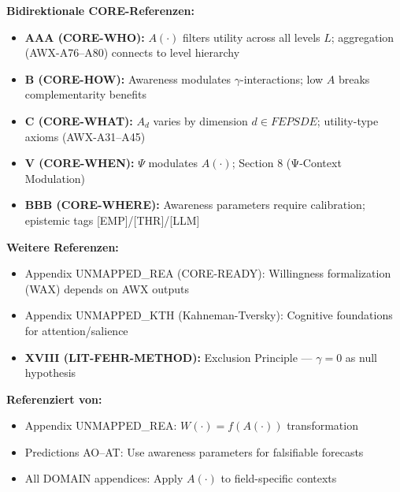\begin{tcolorbox}[colback=purple!5!white, colframe=purple!50!black, title=Cross-Reference Map: 10C CORE Integration]
\textbf{Bidirektionale CORE-Referenzen:}
\begin{itemize}[nosep]
    \item \textbf{AAA (CORE-WHO):} $A(\cdot)$ filters utility across all levels $L$; aggregation (AWX-A76--A80) connects to level hierarchy
    \item \textbf{B (CORE-HOW):} Awareness modulates $\gamma$-interactions; low $A$ breaks complementarity benefits
    \item \textbf{C (CORE-WHAT):} $A_d$ varies by dimension $d \in FEPSDE$; utility-type axioms (AWX-A31--A45)
    \item \textbf{V (CORE-WHEN):} $\Psi$ modulates $A(\cdot)$; Section 8 (Ψ-Context Modulation)
    \item \textbf{BBB (CORE-WHERE):} Awareness parameters require calibration; epistemic tags [EMP]/[THR]/[LLM]
\end{itemize}
\textbf{Weitere Referenzen:}
\begin{itemize}[nosep]
    \item Appendix UNMAPPED_REA (CORE-READY): Willingness formalization (WAX) depends on AWX outputs
    \item Appendix UNMAPPED_KTH (Kahneman-Tversky): Cognitive foundations for attention/salience
    \item \textbf{XVIII (LIT-FEHR-METHOD):} Exclusion Principle --- $\gamma = 0$ as null hypothesis
\end{itemize}
\textbf{Referenziert von:}
\begin{itemize}[nosep]
    \item Appendix UNMAPPED_REA: $W(\cdot) = f(A(\cdot))$ transformation
    \item Predictions AO--AT: Use awareness parameters for falsifiable forecasts
    \item All DOMAIN appendices: Apply $A(\cdot)$ to field-specific contexts
\end{itemize}
\end{tcolorbox}

